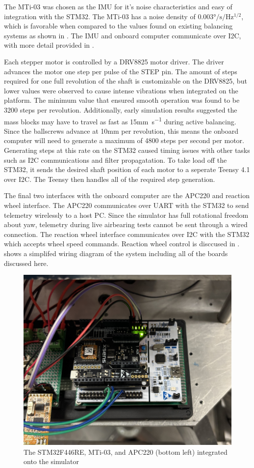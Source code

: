 The MTi-03 was chosen as the IMU for it's noise characteristics and easy of integration with the STM32. The MTi-03 has a noise density of $0.003\si{\degree\per\second\per\Hz^{1/2}}$, which is favorable when compared to the values found on existing balancing systems as shown in . The IMU and onboard computer communicate over I2C, with more detail provided in .

Each stepper motor is controlled by a DRV8825 motor driver. The driver advances the motor one step per pulse of the STEP pin. The amount of steps required for one full revolution of the shaft is customizable on the DRV8825, but lower values were observed to cause intense vibrations when integrated on the platform. The minimum value that ensured smooth operation was found to be 3200 steps per revolution. Additionally, early simulation results suggested the mass blocks may have to travel as fast as 15\si{\mm\per\second} during active balancing. Since the ballscrews advance at 10\si{mm} per revolution, this means the onboard computer will need to generate a maximum of 4800 steps per second per motor. Generating steps at this rate on the STM32 caused timing issues with other tasks such as I2C communications and filter propagatation. To take load off the STM32, it sends the desired shaft position of each motor to a seperate Teensy 4.1 over I2C. The Teensy then handles all of the required step generation.

The final two interfaces with the onboard computer are the APC220 and reaction wheel interface. The APC220 communicates over UART with the STM32 to send telemetry wirelessly to a host PC. Since the simulator has full rotational freedom about yaw, telemetry during live airbearing tests cannot be sent through a wired connection. The reaction wheel interface communicates over I2C with the STM32 which accepts wheel speed commands. Reaction wheel control is disccused in \cite{nalley2025development}.  shows a simplifed wiring diagram of the system including all of the boards discussed here.

\begin{figure}[h]\label{fig:OBC}
    \centering
    \includegraphics[width=0.80\linewidth]{figures/OBC.jpg}
    \caption{The STM32F446RE, MTi-03, and APC220 (bottom left) integrated onto the simulator}

\end{figure}

